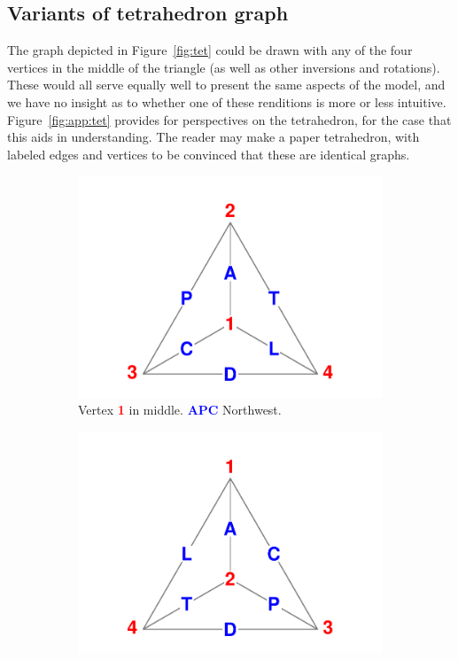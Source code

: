 \documentclass[11pt,oneside]{article} %
\newcommand\vt[1]{%
 \textcolor{red}{\textbf{#1}\hspace{-.3em}}
}
\newcommand\eg[1]{%
 \textcolor{blue}{\textbf{#1}\hspace{-.3em}}
}
\begin{document}
\begin{appendices}
\section{Variants of tetrahedron graph}
The graph depicted in Figure~\ref{fig:tet} could be drawn with any of the
four vertices in the middle of the triangle (as well as other inversions
and rotations).
These would all serve equally well to present the same aspects of the model, and
we have no insight as to whether one of these renditions is more or less
intuitive. Figure~\ref{fig:app:tet} provides for perspectives on the
tetrahedron, for the case that this aids in understanding. The reader may make a
paper tetrahedron, with labeled edges and vertices to be convinced that
these are identical graphs.
\begin{figure}
        \centering
        \caption{Some variants of the graph of the APCTDL tetrahedron.} 
         \label{fig:app:tet}
        \begin{subfigure}[b]{0.475\textwidth}
            \centering
            \includegraphics[width=\textwidth]{Figures/Tetra1.pdf}
           \caption{\small Vertex \vt{1} in middle. \eg{APC} Northwest.}
            \label{fig:tet1}
        \end{subfigure}
        \hfill
        \begin{subfigure}[b]{0.475\textwidth}  
            \centering 
            \includegraphics[width=\textwidth]{Figures/Tetra2.pdf}

\end{subfigure}
\end{figure}
\end{appendices}
\end{document}
